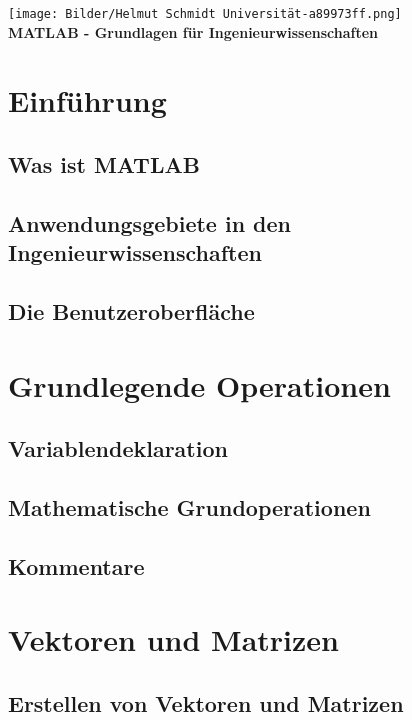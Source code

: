 \documentclass[12pt, a4paper, twoside]{article}
\begin{document}
    \thispagestyle{empty}
     \vspace*{4cm}
    \begin{center}
        \texttt{[image: Bilder/Helmut Schmidt Universität-a89973ff.png]}\\
        \vspace{2cm}
        \huge\textbf{MATLAB - Grundlagen für Ingenieurwissenschaften}
    \end{center}
    \newpage

    \renewcommand{\contentsname}{Inhaltsverzeichnis}
    \tableofcontents
    \newpage
    \section{Einführung}
        \subsection{Was ist MATLAB}
        \subsection{Anwendungsgebiete in den Ingenieurwissenschaften}
        \subsection{Die Benutzeroberfläche} 
    \section{Grundlegende Operationen}
        \subsection{Variablendeklaration}
        \subsection{Mathematische Grundoperationen}
        \subsection{Kommentare}
    \section{Vektoren und Matrizen}
        \subsection{Erstellen von Vektoren und Matrizen}
\end{document}
